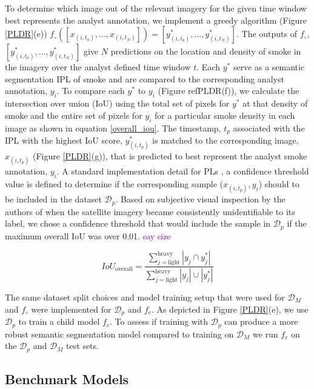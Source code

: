 \documentclass{article}
\newcommand\reynotes[1]{\textcolor{purple}{#1}}
\begin{document}
To determine which image out of the relevant imagery for the given time window best represents the analyst annotation, we implement a greedy algorithm (Figure \ref{PLDR}(e)) \(f_\circ([x_{(i,t_0)},...,x_{(i,t_N)}])=[y^*_{(i,t_0)},...,y^*_{(i,t_N)}]\). The outputs of \(f_{\circ}\), \([y^*_{(i,t_0)},...,y^*_{(i,t_N)}]\) give \(N\) predictions on the location and density of smoke in the imagery over the analyst defined time window \(t\). Each \(y^*\) serve as a semantic segmentation IPL of smoke and are compared to the corresponding analyst annotation, \(y_i\). To compare each \(y^*\) to \(y_i\) (Figure ref{PLDR}(f)), we calculate the intersection over union (IoU) using the total set of pixels for \(y^*\) at that density of smoke and the entire set of pixels for \(y_i\) for a particular smoke density in each image as shown in equation \ref{overall_iou}. The timestamp, \(t_p\) associated with the IPL with the highest IoU score, \(y^*_{(i,t_p)}\) is matched to the corresponding image, \(x_{(i,t_p)}\) (Figure \ref{PLDR}(g)), that is predicted to best represent the analyst smoke annotation, \(y_i\). A standard implementation detail for PLs \cite{conf_thresh}, a confidence threshold value is defined to determine if the corresponding sample (\(x_{(i, t_p)}, y_i\)) should to be included in the dataset \(\mathcal{D}_p\). Based on subjective visual inspection by the authors of when the satellite imagery became consistently unidentifiable to its label, we chose a confidence threshold that would include the sample in \(\mathcal{D}_{p}\) if the maximum overall IoU was over 0.01. 
\reynotes{say size}

\begin{equation} \label{overall_iou}
    IoU_{\text{overall}} = \frac{\sum\limits_{j=\text{light}}^{\text{heavy}}|y_{j}\cap y^*_{j}|}{\sum\limits_{j=\text{light}}^{\text{heavy}}|y_{j}|\cup|y^*_{j}|}
\end{equation}



The same dataset split choices and model training setup that were used for \(\mathcal{D}_{M}\) and \(f_{\circ}\) were implemented for \(\mathcal{D}_p\) and \(f_c\). As depicted in Figure \ref{PLDR}(e), we use \(\mathcal{D}_{p}\) to train a child model \(f_c\). To assess if training with \(\mathcal{D}_{p}\) can produce a more robust semantic segmentation model compared to training on \(\mathcal{D}_M\) we run \(f_c\) on the \(\mathcal{D}_{p}\) and \(\mathcal{D}_{M}\) test sets. 

\subsection{Benchmark Models}
\end{document}
